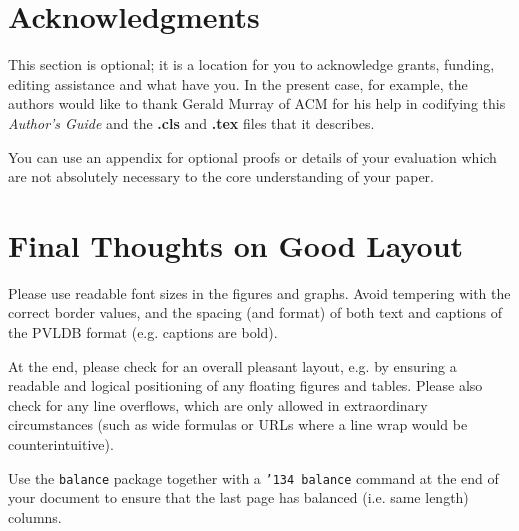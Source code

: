 \documentclass{vldb}
\begin{document}
\balance

\section{Acknowledgments}
This section is optional; it is a location for you
to acknowledge grants, funding, editing assistance and
what have you.  In the present case, for example, the
authors would like to thank Gerald Murray of ACM for
his help in codifying this \textit{Author's Guide}
and the \textbf{.cls} and \textbf{.tex} files that it describes.





\begin{appendix}
You can use an appendix for optional proofs or details of your evaluation which are not absolutely necessary to the core understanding of your paper. 

\section{Final Thoughts on Good Layout}
Please use readable font sizes in the figures and graphs. Avoid tempering with the correct border values, and the spacing (and format) of both text and captions of the PVLDB format (e.g. captions are bold).

At the end, please check for an overall pleasant layout, e.g. by ensuring a readable and logical positioning of any floating figures and tables. Please also check for any line overflows, which are only allowed in extraordinary circumstances (such as wide formulas or URLs where a line wrap would be counterintuitive).

Use the \texttt{balance} package together with a \texttt{\char'134 balance} command at the end of your document to ensure that the last page has balanced (i.e. same length) columns.

\end{appendix}
\end{document}
